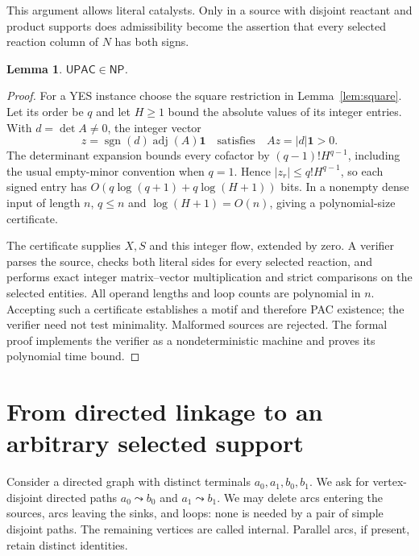 \documentclass[11pt,a4paper]{article}
\newtheorem{lemma}[theorem]{Lemma}
\newcommand{\NP}{\mathsf{NP}}
\newcommand{\UPAC}{\mathsf{UPAC}}
\begin{document}
This argument allows literal catalysts. Only in a source with disjoint
reactant and product supports does admissibility become the assertion that
every selected reaction column of $N$ has both signs.

\pagebreak[3]
\begin{lemma}\label{lem:np}
$\UPAC\in\NP$.
\end{lemma}
\begin{proof}
For a YES instance choose the square restriction in Lemma~\ref{lem:square}.
Let its order be $q$ and let $H\geq1$ bound the absolute values of its integer
entries. With $d=\det A\ne0$, the integer vector
\[
 z=\operatorname{sgn}(d)\operatorname{adj}(A)\mathbf1
 \quad\text{satisfies}\quad Az=|d|\mathbf1>0.
\]
The determinant expansion bounds every cofactor by $(q-1)!H^{q-1}$,
including the usual empty-minor convention when $q=1$. Hence
$|z_r|\leq q!H^{q-1}$, so each signed entry has
$O(q\log(q+1)+q\log(H+1))$ bits. In a nonempty dense input of length $n$,
$q\leq n$ and $\log(H+1)=O(n)$, giving a polynomial-size certificate.

The certificate supplies $X,S$ and this integer flow, extended by zero.
A verifier parses the source, checks both literal sides for every selected
reaction, and performs exact integer matrix--vector multiplication and
strict comparisons on the selected entities. All operand lengths and loop
counts are polynomial in $n$. Accepting such a certificate establishes a
motif and therefore PAC existence; the verifier need not test minimality.
Malformed sources are rejected. The formal proof implements the verifier
as a nondeterministic machine and proves its polynomial time bound.
\end{proof}

\section{From directed linkage to an arbitrary selected support}
Consider a directed graph with distinct terminals $a_0,a_1,b_0,b_1$. We ask
for vertex-disjoint directed paths $a_0\leadsto b_0$ and $a_1\leadsto b_1$.
We may delete arcs entering the sources, arcs leaving the sinks, and loops:
none is needed by a pair of simple disjoint paths. The remaining vertices
are called internal. Parallel arcs, if present, retain distinct identities.
\end{document}
